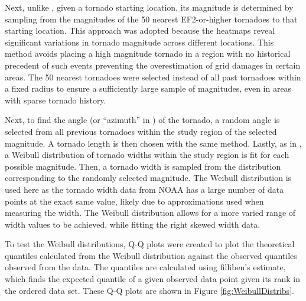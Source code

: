 \documentclass[12pt]{article}
\begin{document}
Next, unlike \cite{strader}, given a tornado starting location, its magnitude is determined by sampling from the magnitudes of the 50 nearest EF2-or-higher tornadoes to that starting location. This approach was adopted because the heatmaps reveal significant variations in tornado magnitude across different locations. This method avoids placing a high magnitude tornado in a region with no historical precedent of such events preventing the overestimation of grid damages in certain areas. The 50 nearest tornadoes were selected instead of all past tornadoes within a fixed radius to ensure a sufficiently large sample of magnitudes, even in areas with sparse tornado history. \par
Next, to find the angle (or “azimuth” in \cite{strader}) of the tornado, a random angle is selected from all previous tornadoes within the study region of the selected magnitude. A tornado length is then chosen with the same method. Lastly, as in \cite{strader}, a Weibull distribution of tornado widths within the study region is fit for each possible magnitude. Then, a tornado width is sampled from the distribution corresponding to the randomly selected magnitude. The Weibull distribution is used here as the tornado width data from NOAA has a large number of data points at the exact same value, likely due to approximations used when measuring the width. The Weibull distribution allows for a more varied range of width values to be achieved, while fitting the right skewed width data. \par
To test the Weibull distributions, Q-Q plots were created to plot the theoretical quantiles calculated from the Weibull distribution against the observed quantiles observed from the data. The quantiles are calculated using filliben’s estimate, which finds the expected quantile of a given observed data point given its rank in the ordered data set. These Q-Q plots are shown in Figure \ref{fig:WeibullDistribs}.  \par
\end{document}
